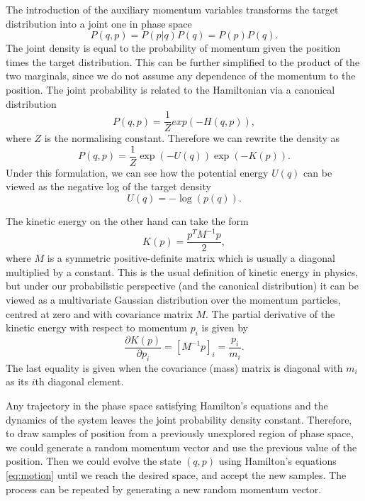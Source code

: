 The introduction of the auxiliary momentum variables transforms the target distribution into a joint one in phase space 
\begin{equation}
	P(q,p) = P(p|q)P(q) = P(p)P(q).
\end{equation}
The joint density is equal to the probability of momentum given the position times the target distribution. This can be further simplified to the product of the two marginals, since we do not assume any dependence of the momentum to the position. The joint probability is related to the Hamiltonian via a canonical distribution
\begin{equation}
	P(q,p) = \frac{1}{Z}exp\left(-H(q,p)\right),
\end{equation}
where $Z$ is the normalising constant. 
Therefore we can rewrite the density as 
\begin{equation}
	P(q, p)=\frac{1}{Z} \exp \left({-U(q)}\right) \exp \left({-K(p)}\right).
\end{equation}
Under this formulation, we can see how the potential energy $U(q)$ can be viewed as the negative log of the target density 
\begin{equation}
	U(q) = -\log(p(q)).
\end{equation}

The kinetic energy on the other hand can take the form 
\begin{equation}
K(p)= \frac{p^T M^{-1}p}{2},
\end{equation}
where $M$ is a symmetric positive-definite matrix which is usually a diagonal multiplied by a constant. This is the usual definition of kinetic energy in physics, but under our probabilistic perspective (and the canonical distribution) it can be viewed as a multivariate Gaussian distribution over the momentum particles, centred at zero and with covariance matrix $M$. The partial derivative of the kinetic energy with respect to momentum $p_i$ is given by
\begin{equation}
	\frac{\partial K(p)}{\partial p_i} = [M^{-1}p]_i = \frac{p_i}{m_i}.
\end{equation}
The last equality is given when the covariance (mass) matrix is diagonal with $m_i$ as its $i$th diagonal element. 

Any trajectory in the phase space satisfying Hamilton's equations and the dynamics of the system leaves the joint probability density constant. Therefore, to draw samples of position from a previously unexplored region of phase space, we could generate a random momentum vector and use the previous value of the position. Then we could evolve the state $(q,p)$ using Hamilton's equations \eqref{eq:motion} until we reach the desired space, and accept the new samples. The process can be repeated by generating a new random momentum vector.


